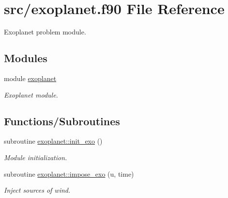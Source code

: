 \hypertarget{exoplanet_8f90}{}\section{src/exoplanet.f90 File Reference}
\label{exoplanet_8f90}


Exoplanet problem module.  


\subsection*{Modules}
\begin{DoxyCompactItemize}
\item 
module \hyperlink{namespaceexoplanet}{exoplanet}
\begin{DoxyCompactList}\small\item\em Exoplanet module. \end{DoxyCompactList}\end{DoxyCompactItemize}
\subsection*{Functions/\+Subroutines}
\begin{DoxyCompactItemize}
\item 
subroutine \hyperlink{namespaceexoplanet_a5d1ffcb76d92b3a92a75e492a7376bce}{exoplanet\+::init\+\_\+exo} ()
\begin{DoxyCompactList}\small\item\em Module initialization. \end{DoxyCompactList}\item 
subroutine \hyperlink{namespaceexoplanet_a025d8839492b18a794c76b5018f43f91}{exoplanet\+::impose\+\_\+exo} (u, time)
\begin{DoxyCompactList}\small\item\em Inject sources of wind. \end{DoxyCompactList}\end{DoxyCompactItemize}
